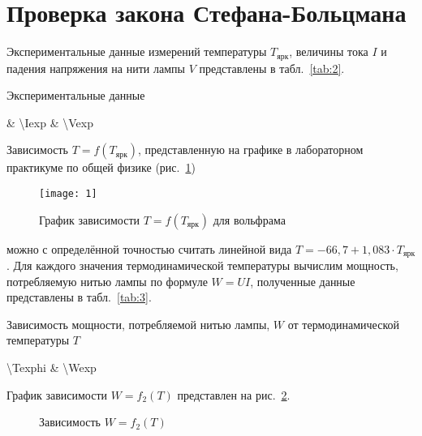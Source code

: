 \documentclass[a4paper]{article}
\begin{document}
\section{Проверка закона Стефана-Больцмана}
Экспериментальные данные измерений температуры $T_\text{ярк}$, величины
тока $I$ и падения напряжения на нити лампы $V$ представлены
в табл.~\ref{tab:2}.
	\begin{table}[htpb]
		\centering
		\caption{Экспериментальные данные}
		\label{tab:2}
			{\Texp & \num{\Iexp} & \num{\Vexp}}
	\end{table}
Зависимость $T=f(T_\text{ярк})$, представленную на графике в лабораторном
практикуме по общей физике (рис.~\ref{fig:1}) \begin{figure}[htpb]
	\centering
	\texttt{[image: 1]}
	\caption{График зависимости $T=f(T_\text{ярк})$ для
	вольфрама}
	\label{fig:1}
\end{figure}
можно с определённой
точностью считать линейной вида $T=-66,7+ 1,083\cdot T_\text{ярк}$. Для каждого значения термодинамической температуры
вычислим мощность, потребляемую нитью лампы по формуле
$W=UI$, полученные данные представлены в табл.~\ref{tab:3}.
	\begin{table}[htpb]
		\centering
		\caption{Зависимость мощности, потребляемой
		нитью лампы, $W$ от термодинамической температуры $T$}
		\label{tab:3}
		{\num{\Texphi} & \num{\Wexp}}
	\end{table}
	График зависимости $W=f_2(T)$ представлен на  рис.~\ref{fig:2}.
\begin{figure}[htpb]
	\centering
	\caption{Зависимость $W=f_2(T)$}
	\label{fig:2}
\end{figure}
\end{document}
